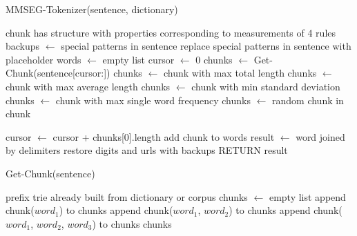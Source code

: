 \documentclass[titlepage]{article}
\begin{document}
\begin{algorithm}
    \renewcommand{\thealgorithm}{}
    \caption{MMSEG-Tokenizer(sentence, dictionary)}
    \begin{algorithmic}[1]
        \REQUIRE chunk has structure with properties corresponding to measurements of 4 rules
        \STATE backups $\leftarrow$ special patterns in sentence
        \STATE replace special patterns in sentence with placeholder
        \STATE words $\leftarrow$ empty list
        \STATE cursor $\leftarrow$ 0
        \REPEAT
        \STATE chunks $\leftarrow$ Get-Chunk(sentence[cursor:])
        \STATE chunks $\leftarrow$ chunk with max total length 
        \ENDIF
        \STATE chunks $\leftarrow$ chunk with max average length 
        \ENDIF
        \STATE chunks $\leftarrow$ chunk with min standard deviation 
        \ENDIF
        \STATE chunks $\leftarrow$ chunk with max single word frequency 
        \ENDIF
        \STATE chunks $\leftarrow$ random chunk in chunk 
        \ENDIF
        
        \STATE cursor $\leftarrow$ cursor + chunks[0].length
        \STATE add chunk to words
        \STATE result $\leftarrow$ word joined by delimiters
        \STATE restore digits and urls with backups
        RETURN result
    \end{algorithmic}
\end{algorithm}

\begin{algorithm}[H]
    \renewcommand{\thealgorithm}{}
    \caption{Get-Chunk(sentence)}
    \begin{algorithmic}[1]
        \REQUIRE prefix trie already built from dictionary or corpus
        \STATE chunks $\leftarrow$ empty list
        \STATE append chunk($word_1$) to chunks
        \STATE append chunk($word_1$, $word_2$) to chunks
        \STATE append chunk($word_1$, $word_2$, $word_3$) to chunks
        \ENDFOR
        \ENDFOR
        \ENDFOR
        \RETURN chunks
    \end{algorithmic}
\end{algorithm}
\end{document}
